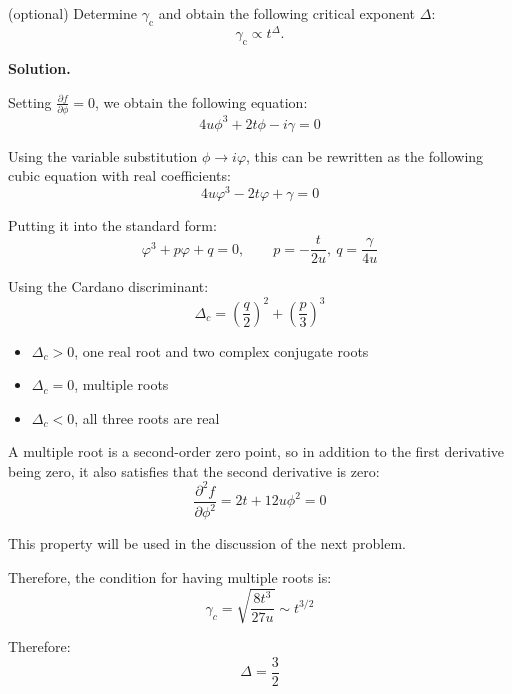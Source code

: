\documentclass[11pt,a4paper]{article}
\newcounter{problem}
\newcounter{saveequation}
\newenvironment{solution}
{
	\par
	\setcounter{saveequation}{\value{equation}}
	\begingroup
	\setcounter{equation}{0}
	\renewcommand{\theequation}{\arabic{problem}.\arabic{equation}}
	\renewcommand{\theHequation}{sol.\arabic{problem}.\arabic{equation}}
	\noindent\textbf{Solution.}\quad
}
{
	\par
	\endgroup
	\setcounter{equation}{\value{saveequation}}
}
\begin{document}
	\begin{problembox}
		(optional) Determine $\gamma_{\mathrm c}$ and obtain the following critical exponent $\Delta$:
		\begin{equation}
			\gamma_{\mathrm c} \propto t^{\Delta}.
			\tag{6}
		\end{equation}
	\end{problembox}
	\begin{solution}
		Setting $\frac{\partial f}{\partial \phi}=0$, we obtain the following equation:
		\begin{equation}
			\label{eq:6.1}
			4u\phi^3+2t\phi-i\gamma=0
		\end{equation}
		
		Using the variable substitution $\phi\to i\varphi$, this can be rewritten as the following cubic equation with real coefficients:
		\begin{equation}
			4u\varphi^3-2t\varphi+\gamma=0
		\end{equation}
		
		Putting it into the standard form:
		\begin{equation}
			\varphi^3+p\varphi+q=0,\qquad p=-\frac{t}{2u},\ q=\frac{\gamma}{4u}
		\end{equation}
		
		Using the Cardano discriminant:
		\begin{equation}
			\Delta_c=\left(\frac{q}{2}\right)^2+\left(\frac{p}{3}\right)^3
		\end{equation}
		
		\begin{itemize}
			\item $\Delta_c>0$, one real root and two complex conjugate roots
			\item $\Delta_c=0$, multiple roots
			\item $\Delta_c<0$, all three roots are real
		\end{itemize}
		
		A multiple root is a second-order zero point, so in addition to the first derivative being zero, it also satisfies that the second derivative is zero:
		\begin{equation}
			\label{eq:6.5}
			\frac{\partial^2 f}{\partial \phi^2}=2t+12u\phi^2=0
		\end{equation}
		
		This property will be used in the discussion of the next problem.
		
	\begin{finalanswer}
			Therefore, the condition for having multiple roots is:
		\begin{equation}
			\label{fin:6}
			\gamma_c=\sqrt{\frac{8t^3}{27u}}\sim t^{3/2}
		\end{equation}
		
		Therefore:
		\begin{equation}
			\Delta=\frac{3}{2}
		\end{equation}
	\end{finalanswer}
	\end{solution}
	
\end{document}
